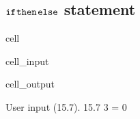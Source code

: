 \documentclass[letterpaper,10pt,italian]{jupyterBook}
\begin{document}
\subsection{\protect\(\texttt{if}\protect\)\sphinxhyphen{}\protect\(\texttt{then}\protect\)\sphinxhyphen{}\protect\(\texttt{else}\protect\) statement}
\label{\detokenize{ch/programming/flow_control:texttt-if-texttt-then-texttt-else-statement}}
\begin{sphinxuseclass}{cell}\begin{sphinxVerbatimInput}

\begin{sphinxuseclass}{cell_input}
\begin{sphinxVerbatim}[commandchars=\\\{\}]

  

            
      
          
      
                  
      
    
\end{sphinxVerbatim}

\end{sphinxuseclass}\end{sphinxVerbatimInput}
\begin{sphinxVerbatimOutput}

\begin{sphinxuseclass}{cell_output}
\begin{sphinxVerbatim}[commandchars=\\\{\}]
User input (15.7). 15.7 \PYGZpc{} 3 = 0
\end{sphinxVerbatim}

\end{sphinxuseclass}\end{sphinxVerbatimOutput}

\end{sphinxuseclass}
\end{document}
